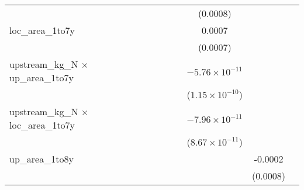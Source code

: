 \begin{tabular}{lcccccccc}
                                                  &                          &                          &                          &                          &                          & (0.0008)                 &                          &   \\   
   loc\_area\_1to7y                               &                          &                          &                          &                          &                          & 0.0007                   &                          &   \\   
                                                  &                          &                          &                          &                          &                          & (0.0007)                 &                          &   \\   
   upstream\_kg\_N $\times$ up\_area\_1to7y       &                          &                          &                          &                          &                          & $-5.76\times 10^{-11}$   &                          &   \\   
                                                  &                          &                          &                          &                          &                          & ($1.15\times 10^{-10}$)  &                          &   \\   
   upstream\_kg\_N $\times$ loc\_area\_1to7y      &                          &                          &                          &                          &                          & $-7.96\times 10^{-11}$   &                          &   \\   
                                                  &                          &                          &                          &                          &                          & ($8.67\times 10^{-11}$)  &                          &   \\   
   up\_area\_1to8y                                &                          &                          &                          &                          &                          &                          & -0.0002                  &   \\   
                                                  &                          &                          &                          &                          &                          &                          & (0.0008)                 &   \\   

\end{tabular}
